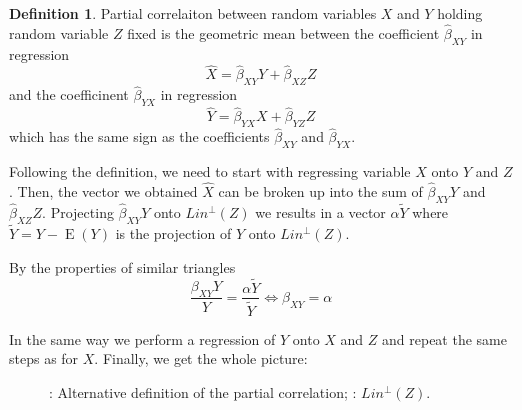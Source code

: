 \documentclass[nobib]{tufte-handout}
\DeclareMathOperator{\E}{E}
\theoremstyle{definition}
\newtheorem{definition}{Definition}
\begin{document}
\begin{definition}
Partial correlaiton between random variables $X$ and $Y$ holding random variable $Z$
fixed is the geometric mean between the coefficient $\hat \beta_{XY}$ in regression
\[
\hat X = \hat \beta_{XY} Y + \hat \beta_{XZ} Z
\]
and the coefficinent $\hat \beta_{YX}$ in regression
\[
\hat Y = \hat \beta_{YX} X + \hat \beta_{YZ} Z
\]
which has the same sign as the coefficients $\hat \beta_{XY}$ and $\hat \beta_{YX}$.
\end{definition}

Following the definition, we need to start with regressing variable $X$ onto
$Y$ and $Z$. Then, the vector we obtained $\hat X$ can be broken up into the sum of
$\hat \beta_{XY} Y$ and $\hat \beta_{XZ} Z$.
Projecting $\hat \beta_{XY} Y$ onto $Lin^{\perp}(Z)$ we results in a vector
$\alpha \widetilde Y$ where $\widetilde Y = Y - \E(Y)$ is the projection of $Y$ onto $Lin^{\perp}(Z)$.

By the properties of similar triangles
\[
\frac{\beta_{XY} Y}{Y} = \frac{\alpha \widetilde Y}{\widetilde Y} \Leftrightarrow \beta_{XY} = \alpha
\]

In the same way we perform a regression of $Y$ onto $X$ and $Z$ and repeat the
same steps as for $X$. Finally, we get the whole picture:

\begin{figure}[ht!]
\begin{center}
\caption{: Alternative definition of the partial correlation;
: $Lin^{\perp}(Z)$.}
\end{center}
\end{figure}
\end{document}
